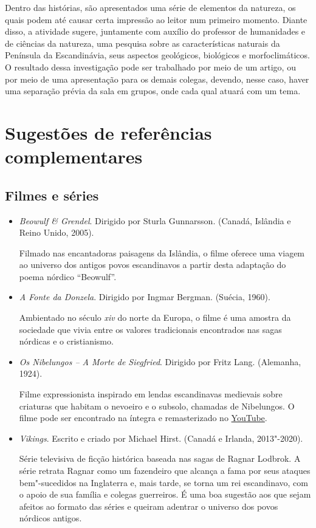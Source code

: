 \documentclass[12pt]{extarticle}
\begin{document}
Dentro das histórias, são apresentados uma série de elementos da
natureza, os quais podem até causar certa impressão ao leitor num
primeiro momento. Diante disso, a atividade sugere, juntamente com
auxílio do professor de humanidades e de ciências da natureza, uma
pesquisa sobre as características naturais da Península da
Escandinávia, seus aspectos geológicos, biológicos e morfoclimáticos.
O resultado dessa investigação pode ser trabalhado por meio de um
artigo, ou por meio de uma apresentação para os demais colegas,
devendo, nesse caso, haver uma separação prévia da sala em grupos,
onde cada qual atuará com um tema.

\section{Sugestões de referências complementares}\label{sugestoes}

\subsection{Filmes e séries}

\begin{itemize}

\item\textit{Beowulf \& Grendel}. Dirigido por Sturla Gunnarsson. (Canadá, Islândia e Reino Unido, 2005).

Filmado nas encantadoras paisagens da Islândia, o filme oferece uma viagem ao universo dos 
antigos povos escandinavos a partir desta adaptação do poema nórdico ``Beowulf''.

\item\textit{A Fonte da Donzela}. Dirigido por Ingmar Bergman. (Suécia, 1960).

Ambientado no século \textit{xiv} do norte da Europa, o filme é uma amostra da sociedade
que vivia entre os valores tradicionais encontrados nas sagas nórdicas e o cristianismo.

\item\textit{Os Nibelungos -- A Morte de Siegfried}. Dirigido por Fritz Lang. (Alemanha, 1924).

Filme expressionista inspirado em lendas escandinavas medievais sobre criaturas que habitam o 
nevoeiro e o subsolo, chamadas de Nibelungos. O filme pode ser encontrado na íntegra 
e remasterizado no \href{https://www.youtube.com/watch?v=HH1BjSZYJ-w}{YouTube}.

\item\textit{Vikings}. Escrito e criado por Michael Hirst. (Canadá e Irlanda, 2013"-2020).

Série televisiva de ficção histórica baseada nas sagas de Ragnar Lodbrok. A série retrata 
Ragnar como um fazendeiro que alcança a fama por seus ataques bem"-sucedidos na Inglaterra e, 
mais tarde, se torna um rei escandinavo, com o apoio de sua família e colegas guerreiros. 
É uma boa sugestão aos que sejam afeitos ao formato das séries e queiram adentrar 
o universo dos povos nórdicos antigos.

\end{itemize}
\end{document}
